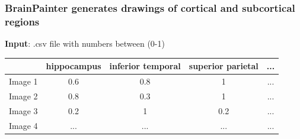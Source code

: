 \documentclass[8pt,xcolor=table]{beamer}
\begin{document}
\begin{frame}[label=current]
\frametitle{BrainPainter generates drawings of cortical and subcortical regions}

\textbf{Input}: .csv file with numbers between (0-1)
\begin{table}
 \begin{tabular}{c | c | c | c | c}
 & hippocampus & inferior temporal & superior parietal & ...\\
 \hline
 Image 1 & 0.6 & 0.8 & 1   & ...\\
 Image 2 & 0.8 & 0.3 & 1   & ...\\
 Image 3 & 0.2 & 1   & 0.2 & ...\\
 Image 4 & ... & ... & ... & ...\\
 \end{tabular}
\end{table}



\end{frame}
\end{document}

